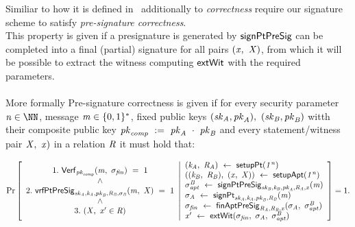 \begin{definition}\label{def:preSigCorrectness}
Similiar to how it is defined in~\cite{aumayr2020bitcoinchannels} additionally to \textit{correctness} require our signature scheme to satisfy \textit{pre-signature correctness}. \\
This property is given if a presignature is generated by $\mathsf{signPtPreSig}$ can be completed into a final (partial) signature for all pairs $(\mathit{x} ,~ \mathit{X})$, from which it will
be possible to extract the witness computing $\mathsf{extWit}$ with the required parameters.\\ \\
More formally Pre-signature correctness is given if for every security parameter $\varN \in \cnstNatural$, message $\mathit{m} \in \{0,1\}^{*}$, fixed public keys $(\mathit{sk}_{\mathit{A}}, \mathit{pk}_{\mathit{A}}) ,~ (\mathit{sk}_{\mathit{B}}, \mathit{pk}_{\mathit{B}})$ witth their composite public key $\mathit{pk}_{\mathit{comp}} ~:=~ \mathit{pk}_{\mathit{A}} ~\cdot~ \mathit{pk}_{\mathit{B}}$ and every statement/witness pair $\mathit{X} ,~ \mathit{x})$ in a relation $\mathit{R}$ it must hold that:
\begin{scriptsize}
    \[
        \Pr\left[
        \begin{array}{c}
            1.~\mathsf{Verf}_{\mathit{pk}_{\mathit{comp}}}(\mathit{m} ,~ \sigma_{\mathit{fin}}) ~=~ 1 \\
            ~\land~ \\
            2.~\mathsf{vrfPtPreSig}_{\mathit{sk}_{\mathit{A}},\mathit{\mathit{k}_{\mathit{A}}},\mathit{pk}_{\mathit{B}},\mathit{R}_{\mathit{B}},\sigma_{\mathit{B}}}(\mathit{m} ,~ \mathit{X}) ~=~ 1 \\
            ~\land~ \\
            3.~(\mathit{X} ,~ \mathit{x}' \in \mathit{R})
        \end{array}
        \middle\vert
        \begin{array}{l}
            (\mathit{\mathit{k}_{\mathit{A}}} ,~ \mathit{R}_{\mathit{A}}) ~\leftarrow~ \mathsf{setupPt} (\mathit{1^n}) \\
            ((\mathit{\mathit{k}_{\mathit{B}}} ,~ \mathit{R}_{\mathit{B}}) ,~ (\mathit{x} ,~ \mathit{X})) ~\leftarrow~ \mathsf{setupApt}(\mathit{1^n}) \\
            \sigma^{\mathit{B}}_{\mathit{apt}} ~\leftarrow~ \mathsf{signPtPreSig}_{\mathit{sk}_{\mathit{B}},\mathit{\mathit{k}_{\mathit{B}}},\mathit{pk}_{\mathit{A}},\mathit{R}_{\mathit{A}},\mathit{x}}(\mathit{m}) \\
            \sigma_{\mathit{A}} ~\leftarrow~ \mathsf{signPt}_{\mathit{sk}_{\mathit{A}},\mathit{\mathit{k}_{\mathit{A}}},\mathit{pk}_{\mathit{B}},\mathit{R}_{\mathit{B}}}(\mathit{m}) \\
            \sigma_{\mathit{fin}} ~\leftarrow~ \mathsf{finAptPreSig}_{\mathit{R}_{\mathit{A}},\mathit{R}_{\mathit{B}},\mathit{x}}(\sigma_{\mathit{A}} ,~ \sigma^{\mathit{B}}_{\mathit{apt}}) \\
            \mathit{x}' ~\leftarrow~ \mathsf{extWit}(\sigma_{\mathit{fin}} ,~ \sigma_{\mathit{A}} ,~ \sigma^{\mathit{B}}_{\mathit{apt}})
        \end{array}
        \right]=1.
    \]
\end{scriptsize}
\end{definition}

